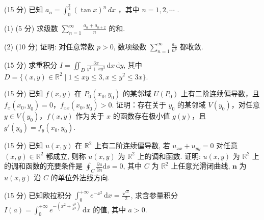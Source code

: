 (15 分) 已知  $a_{n} = \int_{0}^{\frac{\pi}{4}} (\tan x)^{n} \, dx$ ，其中  $n = 1, 2, \cdots$ .\par
(1) (5 分) 求级数 $\sum_{n=1}^{\infty} \frac{a_n + a_{n+2}}{n}$ 的和.\par
(2) (10 分) 证明: 对任意常数 $p > 0$, 数项级数 $\sum_{n=1}^{\infty} \frac{a_n}{n^p}$ 都收敛.\par
\par{}
(15 分) 求重积分 $I = \iint_{D} \frac{3x}{y^2 + xy^3} \, \mathrm{d}x \, \mathrm{d}y$, 其中 $D = \{(x, y) \in \mathbb{R}^2 \mid 1 \leq xy \leq 3, x \leq y^2 \leq 3x\}$.\par
\par{}
(15 分) 已知 $f(x, y)$ 在 $P_0(x_0, y_0)$ 的某邻域 $U(P_0)$ 上有二阶连续偏导数，且 $f_x(x_0, y_0) = 0$，$f_{xx}(x_0, y_0) > 0$. 证明：存在关于 $y_0$ 的某邻域 $V(y_0)$，对任意 $y \in V(y_0)$，$f(x, y)$ 作为关于 $x$ 的函数存在极小值 $g(y)$，且 $g'(y_0) = f_y(x_0, y_0)$.\par
\par{}
(15 分) 已知 $u(x, y)$ 在 $\mathbb{R}^2$ 上有二阶连续偏导数, 若 $u_{xx} + u_{yy} = 0$ 对任意 $(x, y) \in \mathbb{R}^2$ 都成立, 则称 $u(x, y)$ 为 $\mathbb{R}^2$ 上的调和函数. 证明: $u(x, y)$ 为 $\mathbb{R}^2$ 上的调和函数的充要条件是 $\oint_C \frac{\partial u}{\partial n} \mathrm{d}s = 0$, 其中 $C$ 为 $\mathbb{R}^2$ 上任意光滑闭曲线, $\pmb{n}$ 为 $u(x, y)$ 沿 $C$ 的单位外法线方向.\par
\par{}
(15 分) 已知欧拉积分 $\int_0^{+\infty} e^{-x^2} \, \mathrm{d}x = \frac{\sqrt{\pi}}{2}$, 求含参量积分 $I(a) = \int_0^{+\infty} e^{-\left(x^2 + \frac{a^2}{x^2}\right)} \, \mathrm{d}x$ 的值, 其中 $a > 0$.\par
